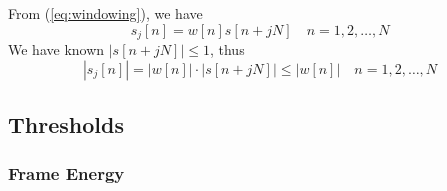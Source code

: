 From (\ref{eq:windowing}), we have
\begin{equation}
s_j[n] = w[n] s[n+jN] \quad n = 1, 2, \dots, N
\end{equation}
We have known $|s[n+jN]| \le 1$, thus
\begin{equation}
\label{hamming-inequation}
|s_j[n]| = |w[n]| \cdot |s[n+jN]| \le |w[n]| \quad n = 1, 2, \dots, N
\end{equation}


\subsection{Thresholds}
\subsubsection{Frame Energy}
